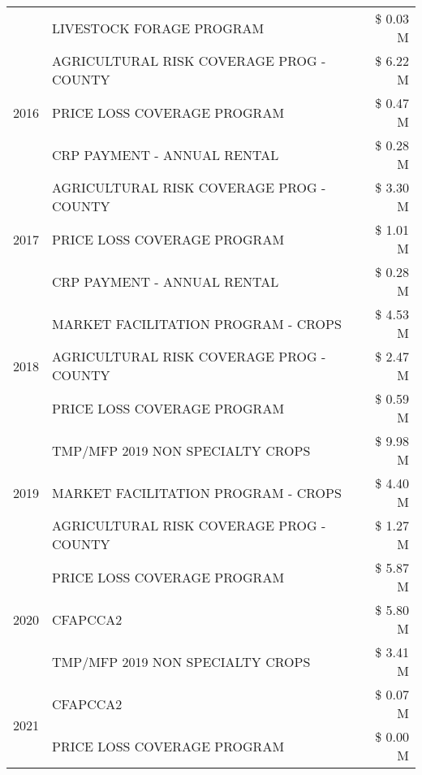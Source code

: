 \begin{tabular}{llr}
 & LIVESTOCK FORAGE PROGRAM & \$ 0.03 M \\
\cline{1-3}
\multirow[t]{3}{*}{2016} & AGRICULTURAL RISK COVERAGE PROG - COUNTY & \$ 6.22 M \\
 & PRICE LOSS COVERAGE PROGRAM & \$ 0.47 M \\
 & CRP PAYMENT - ANNUAL RENTAL & \$ 0.28 M \\
\cline{1-3}
\multirow[t]{3}{*}{2017} & AGRICULTURAL RISK COVERAGE PROG - COUNTY & \$ 3.30 M \\
 & PRICE LOSS COVERAGE PROGRAM & \$ 1.01 M \\
 & CRP PAYMENT - ANNUAL RENTAL & \$ 0.28 M \\
\cline{1-3}
\multirow[t]{3}{*}{2018} & MARKET FACILITATION PROGRAM - CROPS & \$ 4.53 M \\
 & AGRICULTURAL RISK COVERAGE PROG - COUNTY & \$ 2.47 M \\
 & PRICE LOSS COVERAGE PROGRAM & \$ 0.59 M \\
\cline{1-3}
\multirow[t]{3}{*}{2019} & TMP/MFP 2019 NON SPECIALTY CROPS & \$ 9.98 M \\
 & MARKET FACILITATION PROGRAM - CROPS & \$ 4.40 M \\
 & AGRICULTURAL RISK COVERAGE PROG - COUNTY & \$ 1.27 M \\
\cline{1-3}
\multirow[t]{3}{*}{2020} & PRICE LOSS COVERAGE PROGRAM & \$ 5.87 M \\
 & CFAPCCA2 & \$ 5.80 M \\
 & TMP/MFP 2019 NON SPECIALTY CROPS & \$ 3.41 M \\
\cline{1-3}
\multirow[t]{2}{*}{2021} & CFAPCCA2 & \$ 0.07 M \\
 & PRICE LOSS COVERAGE PROGRAM & \$ 0.00 M \\
\cline{1-3}
\bottomrule
\end{tabular}
